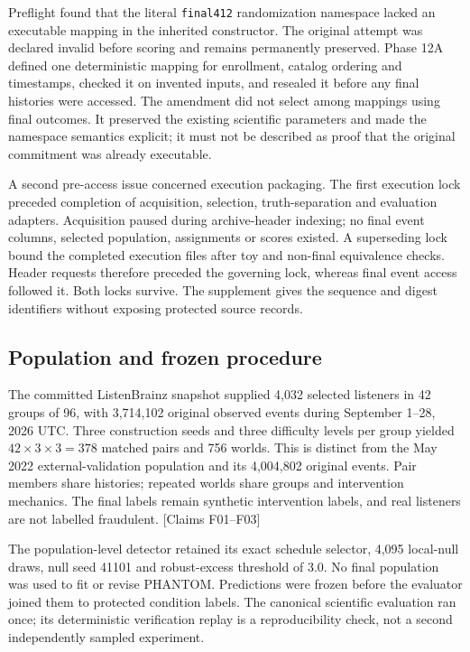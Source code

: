 \documentclass[11pt,letterpaper]{article}
\newcommand{\claims}[1]{{\small\textsf{[Claims #1]}}}
\begin{document}
Preflight found that the literal \texttt{final412} randomization namespace lacked an executable mapping in the inherited constructor. The original attempt was declared invalid before scoring and remains permanently preserved. Phase 12A defined one deterministic mapping for enrollment, catalog ordering and timestamps, checked it on invented inputs, and resealed it before any final histories were accessed. The amendment did not select among mappings using final outcomes. It preserved the existing scientific parameters and made the namespace semantics explicit; it must not be described as proof that the original commitment was already executable.

A second pre-access issue concerned execution packaging. The first execution lock preceded completion of acquisition, selection, truth-separation and evaluation adapters. Acquisition paused during archive-header indexing; no final event columns, selected population, assignments or scores existed. A superseding lock bound the completed execution files after toy and non-final equivalence checks. Header requests therefore preceded the governing lock, whereas final event access followed it. Both locks survive. The supplement gives the sequence and digest identifiers without exposing protected source records.

\subsection{Population and frozen procedure}
The committed ListenBrainz snapshot supplied 4,032 selected listeners in 42 groups of 96, with 3,714,102 original observed events during September 1--28, 2026 UTC. Three construction seeds and three difficulty levels per group yielded $42\times3\times3=378$ matched pairs and 756 worlds. This is distinct from the May 2022 external-validation population and its 4,004,802 original events. Pair members share histories; repeated worlds share groups and intervention mechanics. The final labels remain synthetic intervention labels, and real listeners are not labelled fraudulent. \claims{F01--F03}

The population-level detector retained its exact schedule selector, 4,095 local-null draws, null seed 41101 and robust-excess threshold of 3.0. No final population was used to fit or revise PHANTOM. Predictions were frozen before the evaluator joined them to protected condition labels. The canonical scientific evaluation ran once; its deterministic verification replay is a reproducibility check, not a second independently sampled experiment.
\end{document}
